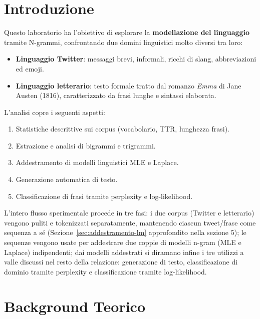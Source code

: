﻿\documentclass[12pt,a4paper]{article}
\begin{document}
\section{Introduzione}

Questo laboratorio ha l'obiettivo di esplorare la \textbf{modellazione del linguaggio} tramite N-grammi, confrontando due domini linguistici molto diversi tra loro:

\begin{itemize}
  \item \textbf{Linguaggio Twitter}: messaggi brevi, informali, ricchi di slang, abbreviazioni ed emoji.
  \item \textbf{Linguaggio letterario}: testo formale tratto dal romanzo \textit{Emma} di Jane Austen (1816), caratterizzato da frasi lunghe e sintassi elaborata.
\end{itemize}

L'analisi copre i seguenti aspetti:
\begin{enumerate}
  \item Statistiche descrittive sui corpus (vocabolario, TTR, lunghezza frasi).
  \item Estrazione e analisi di bigrammi e trigrammi.
  \item Addestramento di modelli linguistici MLE e Laplace.
  \item Generazione automatica di testo.
  \item Classificazione di frasi tramite perplexity e log-likelihood.
\end{enumerate}

L'intero flusso sperimentale procede in tre fasi: i due corpus (Twitter e letterario) vengono puliti e tokenizzati separatamente, mantenendo ciascun tweet/frase come sequenza a sé (Sezione~\ref{sec:addestramento-lm} approfondito nella sezione 5); le sequenze vengono usate per addestrare due coppie di modelli n-gram (MLE e Laplace) indipendenti; dai modelli addestrati si diramano infine i tre utilizzi a valle discussi nel resto della relazione: generazione di testo, classificazione di dominio tramite perplexity e classificazione tramite log-likelihood.

\section{Background Teorico}
\end{document}
